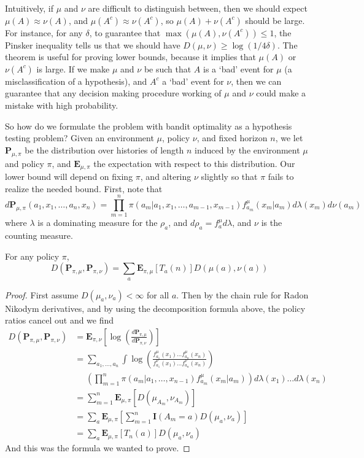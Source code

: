 Intuitively, if $\mu$ and $\nu$ are difficult to distinguish between, then we should expect $\mu(A) \approx \nu(A)$, and $\mu(A^c) \approx \nu(A^c)$, so $\mu(A) + \nu(A^c)$ should be large. For instance, for any $\delta$, to guarantee that $\max(\mu(A),\nu(A^c)) \leq 1$, the Pinsker inequality tells us that we should have $D(\mu,\nu) \geq \log(1/4\delta)$. The theorem is useful for proving lower bounds, because it implies that $\mu(A)$ or $\nu(A^c)$ is large. If we make $\mu$ and $\nu$ be such that $A$ is a `bad' event for $\mu$ (a misclassification of a hypothesis), and $A^c$ a `bad' event for $\nu$, then we can guarantee that any decision making procedure working of $\mu$ and $\nu$ could make a mistake with high probability.

So how do we formulate the problem with bandit optimality as a hypothesis testing problem? Given an environment $\mu$, policy $\nu$, and fixed horizon $n$, we let $\mathbf{P}_{\mu, \pi}$ be the distribution over histories of length $n$ induced by the environment $\mu$ and policy $\pi$, and $\mathbf{E}_{\mu, \pi}$ the expectation with respect to this distribution. Our lower bound will depend on fixing $\pi$, and altering $\nu$ slightly so that $\pi$ fails to realize the needed bound. First, note that
%
\[ d\mathbf{P}_{\mu, \pi}(a_1,x_1,\dots,a_n,x_n) = \prod_{m = 1}^n \pi(a_m | a_1, x_1, \dots, a_{m-1}, x_{m-1}) f^\mu_{a_m} (x_m | a_m) d\lambda(x_m) d\nu(a_m) \]
%
where $\lambda$ is a dominating measure for the $\rho_a$, and $d\rho_a = f^\mu_a d\lambda$, and $\nu$ is the counting measure.

\begin{lemma}
    For any policy $\pi$,
    \[ D(\mathbf{P}_{\pi, \mu}, \mathbf{P}_{\pi, \nu}) = \sum_a \mathbf{E}_{\pi, \mu}[T_a(n)] D(\mu(a), \nu(a)) \]
\end{lemma}
\begin{proof}
    First assume $D(\mu_a, \nu_a) < \infty$ for all $a$. Then by the chain rule for Radon Nikodym derivatives, and by using the decomposition formula above, the policy ratios cancel out and we find
    \begin{align*}
        D(\mathbf{P}_{\pi, \mu}, \mathbf{P}_{\pi, \nu}) &= \mathbf{E}_{\pi, \nu} \left[\log \left( \frac{d\mathbf{P}_{\pi, \mu}}{d\mathbf{P}_{\pi, \nu}} \right) \right]\\
        &= \sum_{a_1, \dots, a_n} \int \log \left( \frac{f_{a_1}^\mu(x_1) \dots f_{a_n}^\mu(x_n)}{f_{a_1}^\nu(x_1) \dots f_{a_n}^\nu(x_n)} \right) \\
        &\ \ \ \ \ \ \left( \prod_{m = 1}^n \pi(a_m | a_1, \dots, x_{n-1}) f_{a_m}^\mu(x_m | a_m) \right) d\lambda(x_1) \dots d\lambda(x_n)\\
        &= \sum_{m = 1}^n \mathbf{E}_{\mu,\pi}[D(\mu_{A_m}, \nu_{A_m})]\\
        &= \sum_a \mathbf{E}_{\mu, \pi} \left[ \sum_{m = 1}^n \mathbf{I}(A_m = a) D(\mu_a, \nu_a) \right]\\
        &= \sum_a \mathbf{E}_{\mu, \pi}[T_n(a)] D(\mu_a, \nu_a)
    \end{align*}
    And this was the formula we wanted to prove.
\end{proof}

